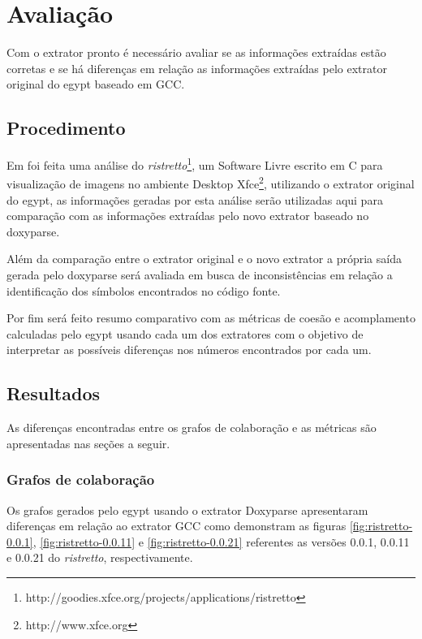 \chapter{Avaliação} \label{ch:avaliacao}

Com o extrator pronto é necessário avaliar se as informações extraídas estão
corretas e se há diferenças em relação as informações extraídas pelo extrator
original do egypt baseado em GCC.

\section{Procedimento}

Em \cite{structuralComplexityEvolution} foi feita uma análise do {\it
ristretto}\footnote{http://goodies.xfce.org/projects/applications/ristretto},
um Software Livre escrito em C para visualização de imagens no ambiente Desktop
Xfce\footnote{http://www.xfce.org}, utilizando o extrator original do egypt, as
informações geradas por esta análise serão utilizadas aqui para comparação com
as informações extraídas pelo novo extrator baseado no doxyparse.

Além da comparação entre o extrator original e o novo extrator a própria saída
gerada pelo doxyparse será avaliada em busca de inconsistências em relação a
identificação dos símbolos encontrados no código fonte.

Por fim será feito resumo comparativo com as métricas de coesão e acomplamento
calculadas pelo egypt usando cada um dos extratores com o objetivo de
interpretar as possíveis diferenças nos números encontrados por cada um.

\section{Resultados}

As diferenças encontradas entre os grafos de colaboração e as métricas são
apresentadas nas seções a seguir.

\subsection{Grafos de colaboração}

Os grafos gerados pelo egypt usando o extrator Doxyparse apresentaram
diferenças em relação ao extrator GCC como demonstram as figuras
\ref{fig:ristretto-0.0.1}, \ref{fig:ristretto-0.0.11} e
\ref{fig:ristretto-0.0.21} referentes as versões 0.0.1, 0.0.11 e 0.0.21 do {\it
ristretto}, respectivamente.

